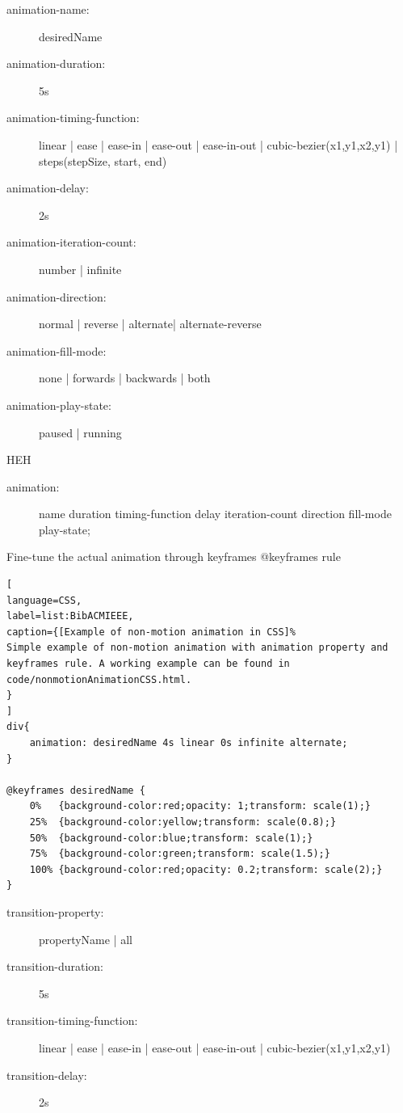 \begin{description}
\item [animation-name:] desiredName
\item [animation-duration:] 5s
\item [animation-timing-function:] linear | ease | ease-in | ease-out | ease-in-out | cubic-bezier(x1,y1,x2,y1) | steps(stepSize, start, end)
\item [animation-delay:] 2s
\item [animation-iteration-count:] number | infinite
\item [animation-direction:] normal | reverse | alternate| alternate-reverse
\item [animation-fill-mode:] none | forwards | backwards | both
\item [animation-play-state:] paused | running
\end{description}
HEH

\begin{description}
\item [animation:] name duration timing-function delay iteration-count direction fill-mode play-state;
\end{description}

Fine-tune the actual animation through keyframes
@keyframes rule


\begin{lstlisting}[
language=CSS,
label=list:BibACMIEEE,
caption={[Example of non-motion animation in CSS]%
Simple example of non-motion animation with animation property and keyframes rule. A working example can be found in code/nonmotionAnimationCSS.html.
}
]
div{
	animation: desiredName 4s linear 0s infinite alternate;
}

@keyframes desiredName {
	0%   {background-color:red;opacity: 1;transform: scale(1);}
	25%  {background-color:yellow;transform: scale(0.8);}
	50%  {background-color:blue;transform: scale(1);}
	75%  {background-color:green;transform: scale(1.5);}
	100% {background-color:red;opacity: 0.2;transform: scale(2);}
}
\end{lstlisting}


\label{sub:CSS_transition}


\begin{description}
\item [transition-property:] propertyName | all
\item [transition-duration:] 5s
\item [transition-timing-function:] linear | ease | ease-in | ease-out | ease-in-out | cubic-bezier(x1,y1,x2,y1)
\item [transition-delay:] 2s
\end{description}


